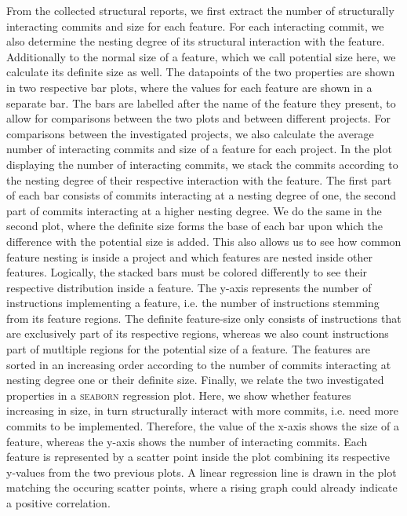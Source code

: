 From the collected structural reports, we first extract the number of structurally interacting commits and size for each feature.
For each interacting commit, we also determine the nesting degree of its structural interaction with the feature.
Additionally to the normal size of a feature, which we call \textsf{potential} size here, we calculate its \textsf{definite} size as well. 
The datapoints of the two properties are shown in two respective bar plots, where the values for each feature are shown in a separate bar.
The bars are labelled after the name of the feature they present, to allow for comparisons between the two plots and between different projects.
For comparisons between the investigated projects, we also calculate the average number of interacting commits and size of a feature for each project.
In the plot displaying the number of interacting commits, we stack the commits according to the nesting degree of their respective interaction with the feature.
The first part of each bar consists of commits interacting at a nesting degree of one, the second part of commits interacting at a higher nesting degree.
We do the same in the second plot, where the definite size forms the base of each bar upon which the difference with the potential size is added.
This also allows us to see how common feature nesting is inside a project and which features are nested inside other features.
Logically, the stacked bars must be colored differently to see their respective distribution inside a feature.
The y-axis represents the number of instructions implementing a feature, i.e. the number of instructions stemming from its feature regions.
The definite feature-size only consists of instructions that are exclusively part of its respective regions, whereas we also count instructions part of mutltiple regions for the potential size of a feature.
The features are sorted in an increasing order according to the number of commits interacting at nesting degree one or their definite size.
Finally, we relate the two investigated properties in a \textsc{seaborn} regression plot.
Here, we show whether features increasing in size, in turn structurally interact with more commits, i.e. need more commits to be implemented.
Therefore, the value of the x-axis shows the size of a feature, whereas the y-axis shows the number of interacting commits.
Each feature is represented by a scatter point inside the plot combining its respective y-values from the two previous plots.
A linear regression line is drawn in the plot matching the occuring scatter points, where a rising graph could already indicate a positive correlation.
